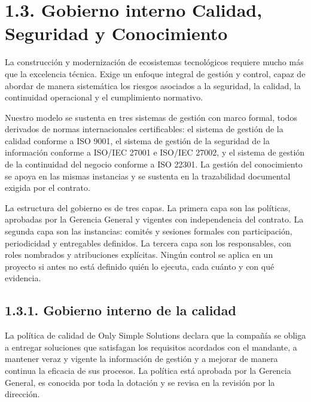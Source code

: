 \documentclass[11pt]{article}
\begin{document}
\section{1.3. Gobierno interno Calidad, Seguridad y Conocimiento}\label{gobierno-interno-calidad-seguridad-y-conocimiento}

La construcción y modernización de ecosistemas tecnológicos requiere mucho más que la excelencia técnica. Exige un enfoque integral de gestión y control, capaz de abordar de manera sistemática los riesgos asociados a la seguridad, la calidad, la continuidad operacional y el cumplimiento normativo.

Nuestro modelo se sustenta en tres sistemas de gestión con marco formal, todos derivados de normas internacionales certificables: el sistema de gestión de la calidad conforme a ISO 9001, el sistema de gestión de la seguridad de la información conforme a ISO/IEC 27001 e ISO/IEC 27002, y el sistema de gestión de la continuidad del negocio conforme a ISO 22301. La gestión del conocimiento se apoya en las mismas instancias y se sustenta en la trazabilidad documental exigida por el contrato.

La estructura del gobierno es de tres capas. La primera capa son las políticas, aprobadas por la Gerencia General y vigentes con independencia del contrato. La segunda capa son las instancias: comités y sesiones formales con participación, periodicidad y entregables definidos. La tercera capa son los responsables, con roles nombrados y atribuciones explícitas. Ningún control se aplica en un proyecto si antes no está definido quién lo ejecuta, cada cuánto y con qué evidencia.

\subsection{1.3.1. Gobierno interno de la calidad}\label{gobierno-interno-de-la-calidad}

La política de calidad de Only Simple Solutions declara que la compañía se obliga a entregar soluciones que satisfagan los requisitos acordados con el mandante, a mantener veraz y vigente la información de gestión y a mejorar de manera continua la eficacia de sus procesos. La política está aprobada por la Gerencia General, es conocida por toda la dotación y se revisa en la revisión por la dirección.
\end{document}
